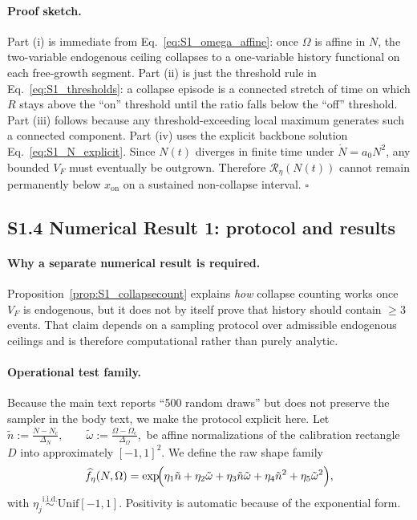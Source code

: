 \documentclass[11pt]{article}
\begin{document}
\paragraph{Proof sketch.}
Part (i) is immediate from Eq.~\eqref{eq:S1_omega_affine}: once \(\Omega\) is affine in \(N\), the
two-variable endogenous ceiling collapses to a one-variable history functional on each free-growth
segment. Part (ii) is just the threshold rule in Eq.~\eqref{eq:S1_thresholds}: a collapse episode is a
connected stretch of time on which \(R\) stays above the ``on'' threshold until the ratio falls below the
``off'' threshold. Part (iii) follows because any threshold-exceeding local maximum generates such a
connected component. Part (iv) uses the explicit backbone solution
Eq.~\eqref{eq:S1_N_explicit}. Since \(N(t)\) diverges in finite time under \(\dot N=a_0N^2\), any bounded
\(V_F\) must eventually be outgrown. Therefore \(\mathcal R_\eta(N(t))\) cannot remain permanently
below \(x_{\mathrm{on}}\) on a sustained non-collapse interval. \hfill\(\square\)

\subsection*{S1.4 Numerical Result 1: protocol and results}

\paragraph{Why a separate numerical result is required.}
Proposition~\ref{prop:S1_collapsecount} explains \emph{how} collapse counting works once \(V_F\)
is endogenous, but it does not by itself prove that history should contain \(\ge 3\) events.
That claim depends on a sampling protocol over admissible endogenous ceilings and is therefore
computational rather than purely analytic.

\paragraph{Operational test family.}
Because the main text reports ``500 random draws'' but does not preserve the sampler in the body
text, we make the protocol explicit here.
Let
$\tilde n:=\frac{N-N_c}{\Delta_N},\qquad
\tilde\omega:=\frac{\Omega-\Omega_c}{\Delta_\Omega},$
be affine normalizations of the calibration rectangle \(D\) into approximately \([-1,1]^2\).
We define the raw shape family
\begin{equation}
\widehat f_\eta(N,\Omega)=
\exp\!\Bigl(
\eta_1\tilde n+\eta_2\tilde\omega+\eta_3\tilde n\tilde\omega+\eta_4\tilde n^2+\eta_5\tilde\omega^2
\Bigr),
\label{eq:S1_rawfamily}
\end{equation}
with \(\eta_j\stackrel{\mathrm{i.i.d.}}{\sim}\mathrm{Unif}[-1,1]\).
Positivity is automatic because of the exponential form.
\end{document}
